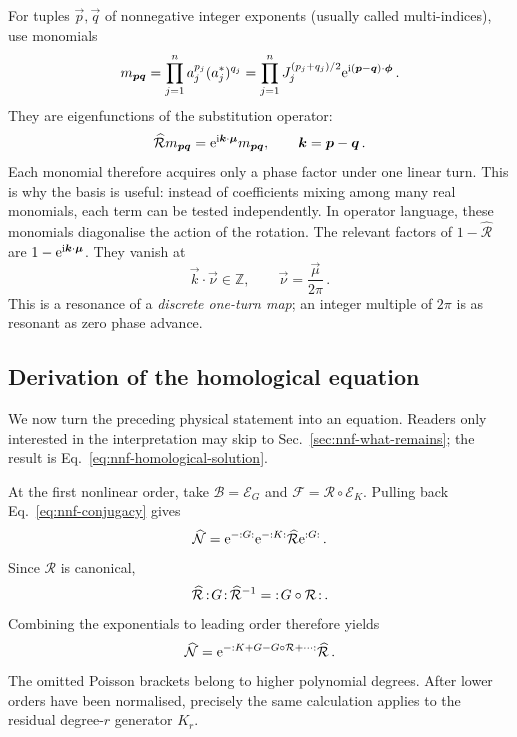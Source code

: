 For tuples $\vec p,\vec q$ of nonnegative integer exponents (usually called
multi-indices), use monomials
\begin{equation}
    m_{\bm{p}\bm{q}} = \prod_{j = 1}^n a_j^{p_j}(a_j^*)^{q_j} = \prod_{j = 1}^n J_j^{(p_j + q_j)/2}
    \mathrm{e}^{\mathrm{i}(\bm{p}-\bm{q})\cdot\bm{\phi}}\,.
\end{equation}
They are eigenfunctions of the substitution operator:
\begin{equation}\label{eq:nnf-resonance-eigenvalue}
    \widehat{\mathcal R}m_{\bm{p}\bm{q}} = \mathrm{e}^{\mathrm{i}\bm{k}\cdot\bm{\mu}}m_{\bm{p}\bm{q}},
    \qquad \bm{k} = \bm{p}-\bm{q}\,.
\end{equation}
Each monomial therefore acquires only a phase factor under one linear turn.
This is why the basis is useful: instead of coefficients mixing among many
real monomials, each term can be tested independently.  In operator language,
these monomials diagonalise the action of the rotation.  The relevant factors
of $1-\widehat{\mathcal R}$ are
$1-\mathrm{e}^{\mathrm{i}\bm{k}\cdot\bm{\mu}}$.  They vanish at
\begin{equation}\label{eq:nnf-resonance-condition}
    \vec k\cdot\vec\nu\in\mathbb Z,\qquad \vec\nu = \frac{\vec\mu}{2\pi}\,.
\end{equation}
This is a resonance of a \emph{discrete one-turn map}; an integer multiple
of $2\pi$ is as resonant as zero phase advance.


\subsection{Derivation of the homological equation}

We now turn the preceding physical statement into an equation.  Readers only
interested in the interpretation may skip to
Sec.~\ref{sec:nnf-what-remains}; the result is Eq.~\eqref{eq:nnf-homological-solution}.

At the first nonlinear order, take $\mathcal B = \mathcal E_G$ and
$\mathcal F = \mathcal R\circ\mathcal E_K$.  Pulling back
Eq.~\eqref{eq:nnf-conjugacy} gives
\begin{equation}
    \widehat{\mathcal N} = \mathrm{e}^{-{:{G}:}}\mathrm{e}^{-{:{K}:}}\widehat{\mathcal R}\mathrm{e}^{{:{G}:}}\,.
\end{equation}
Since $\mathcal R$ is canonical,
\begin{equation}
    \widehat{\mathcal R}\,{:\!{G}\!:}\,
    \widehat{\mathcal R}^{-1} = {:\!{G\circ\mathcal R}\!:}\,.
\end{equation}
Combining the exponentials to leading order therefore yields
\begin{equation}\label{eq:nnf-leading-conjugation}
    \widehat{\mathcal N} = \mathrm{e}^{-{:{K + G-G\circ\mathcal R + \cdots}:}}\widehat{\mathcal R}\,.
\end{equation}
The omitted Poisson brackets belong to higher polynomial degrees.  After
lower orders have been normalised, precisely the same calculation applies
to the residual degree-$r$ generator $K_r$.

